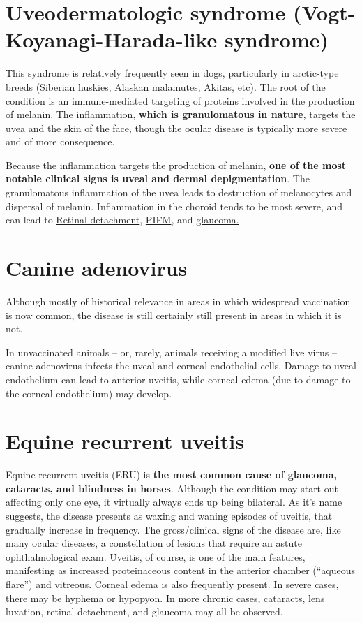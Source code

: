 \documentclass[openany]{book}
\begin{document}
\section{Uveodermatologic syndrome (Vogt-Koyanagi-Harada-like
syndrome)}\label{uveodermatologic-syndrome-vogt-koyanagi-harada-like-syndrome}

This syndrome is relatively frequently seen in dogs, particularly in
arctic-type breeds (Siberian huskies, Alaskan malamutes, Akitas, etc).
The root of the condition is an immune-mediated targeting of proteins
involved in the production of melanin. The inflammation, \textbf{which
is granulomatous in nature}, targets the uvea and the skin of the face,
though the ocular disease is typically more severe and of more
consequence.

Because the inflammation targets the production of melanin, \textbf{one
of the most notable clinical signs is uveal and dermal depigmentation}.
The granulomatous inflammation of the uvea leads to destruction of
melanocytes and dispersal of melanin. Inflammation in the choroid tends
to be most severe, and can lead to
\protect\hyperlink{retinal-detachment}{Retinal detachment},
\protect\hyperlink{pre-iridial-fibrovascular-membranes-pifm}{PIFM}, and
\protect\hyperlink{glaucoma}{glaucoma.}

\section{Canine adenovirus}\label{canine-adenovirus}

Although mostly of historical relevance in areas in which widespread
vaccination is now common, the disease is still certainly still present
in areas in which it is not.

In unvaccinated animals -- or, rarely, animals receiving a modified live
virus -- canine adenovirus infects the uveal and corneal endothelial
cells. Damage to uveal endothelium can lead to anterior uveitis, while
corneal edema (due to damage to the corneal endothelium) may develop.

\hypertarget{equine-recurrent-uveitis}{\section{Equine recurrent
uveitis}\label{equine-recurrent-uveitis}}

Equine recurrent uveitis (ERU) is \textbf{the most common cause of
glaucoma, cataracts, and blindness in horses}. Although the condition
may start out affecting only one eye, it virtually always ends up being
bilateral. As it's name suggests, the disease presents as waxing and
waning episodes of uveitis, that gradually increase in frequency. The
gross/clinical signs of the disease are, like many ocular diseases, a
constellation of lesions that require an astute ophthalmological exam.
Uveitis, of course, is one of the main features, manifesting as
increased proteinaceous content in the anterior chamber (``aqueous
flare'') and vitreous. Corneal edema is also frequently present. In
severe cases, there may be hyphema or hypopyon. In more chronic cases,
cataracts, lens luxation, retinal detachment, and glaucoma may all be
observed.
\end{document}
